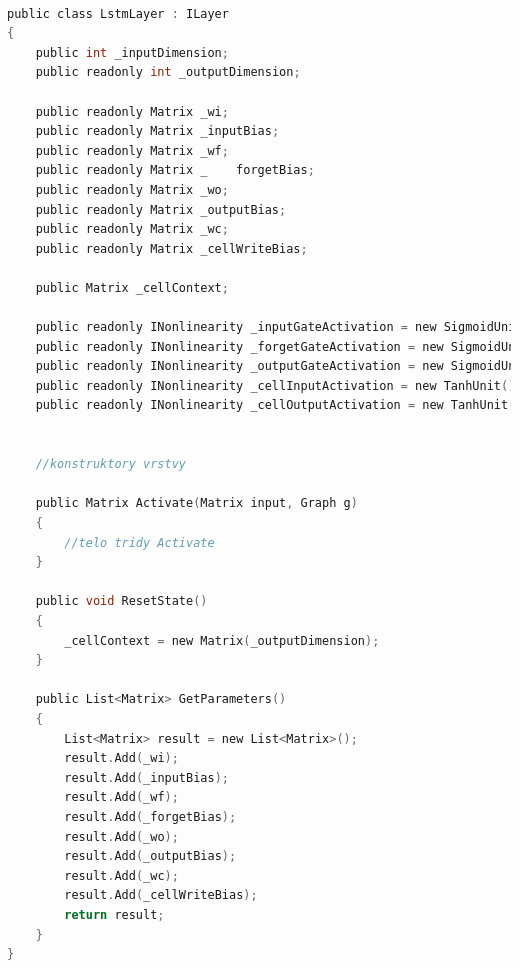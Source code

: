 \documentclass[a4paper]{article}
\begin{document}
\begin{lstlisting}[language=c, title={Ukázka třídy LstmLayer}]

public class LstmLayer : ILayer
{
    public int _inputDimension;
    public readonly int _outputDimension;

    public readonly Matrix _wi;
    public readonly Matrix _inputBias;
    public readonly Matrix _wf;
    public readonly Matrix _	forgetBias;
    public readonly Matrix _wo;
    public readonly Matrix _outputBias;
    public readonly Matrix _wc;
    public readonly Matrix _cellWriteBias;

    public Matrix _cellContext;

    public readonly INonlinearity _inputGateActivation = new SigmoidUnit();
    public readonly INonlinearity _forgetGateActivation = new SigmoidUnit();
    public readonly INonlinearity _outputGateActivation = new SigmoidUnit();
    public readonly INonlinearity _cellInputActivation = new TanhUnit();
    public readonly INonlinearity _cellOutputActivation = new TanhUnit();


    //konstruktory vrstvy
    
    public Matrix Activate(Matrix input, Graph g)
    {
	    //telo tridy Activate
    }

    public void ResetState()
    {
        _cellContext = new Matrix(_outputDimension);
    }

    public List<Matrix> GetParameters()
    {
        List<Matrix> result = new List<Matrix>();
        result.Add(_wi);
        result.Add(_inputBias);
        result.Add(_wf);
        result.Add(_forgetBias);
        result.Add(_wo);
        result.Add(_outputBias);
        result.Add(_wc);
        result.Add(_cellWriteBias);
        return result;
    }
}


\end{lstlisting}
\end{document}
